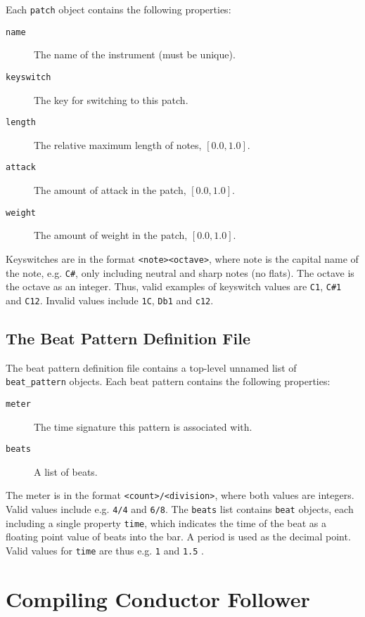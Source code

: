 \documentclass[12pt,a4paper]{article}
\newcommand{\CF}{Conductor Follower}
\begin{document}
Each \texttt{patch} object contains the following properties:
\begin{description}
\item[\texttt{name}] The name of the instrument (must be unique).
\item[\texttt{keyswitch}] The key for switching to this patch.
\item[\texttt{length}] The relative maximum length of notes, $[0.0, 1.0]$.
\item[\texttt{attack}] The amount of attack in the patch, $[0.0, 1.0]$.
\item[\texttt{weight}] The amount of weight in the patch, $[0.0, 1.0]$.
\end{description}
Keyswitches are in the format \texttt{<note><octave>},
where note is the capital name of the note,
e.g. \texttt{C\#}, only including neutral and sharp notes (no flats).
The octave is the octave as an integer.
Thus, valid examples of keyswitch values are
\texttt{C1}, \texttt{C\#1} and \texttt{C12}.
Invalid values include
\texttt{1C}, \texttt{Db1} and \texttt{c12}.

\subsection{The Beat Pattern Definition File}

The beat pattern definition file contains a
top-level unnamed list of \texttt{beat\_pattern} objects.
Each beat pattern contains the following properties:
\begin{description}
\item[\texttt{meter}] The time signature this pattern is associated with.
\item[\texttt{beats}] A list of beats.
\end{description}
The meter is in the format \texttt{<count>/<division>},
where both values are integers.
Valid values include e.g. \texttt{4/4} and \texttt{6/8}.
The \texttt{beats} list contains \texttt{beat} objects,
each including a single property \texttt{time},
which indicates the time of the beat as a
floating point value of beats into the bar.
A period is used as the decimal point.
Valid values for \texttt{time} are thus e.g.
\texttt{1} and \texttt{1.5} .


\section{Compiling \CF{}}
\end{document}
